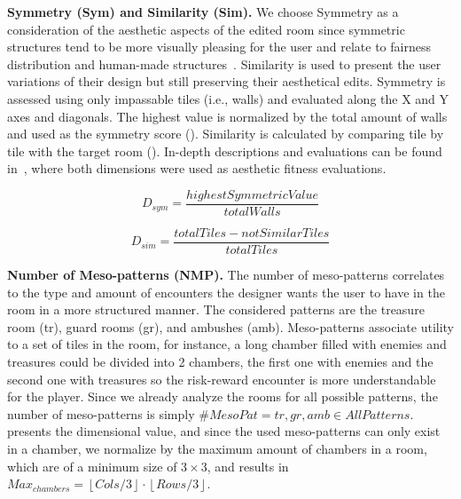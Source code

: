 \textbf{Symmetry (Sym) and Similarity (Sim).} We choose Symmetry as a consideration of the aesthetic aspects of the edited room since symmetric structures tend to be more visually pleasing for the user and relate to fairness distribution and human-made structures~\cite{p6marinho2016-symmetry,Alvarez2018a,Liapis2012-adaptiveVisual}. Similarity is used to present the user variations of their design but still preserving their aesthetical edits. Symmetry is assessed using only impassable tiles (i.e., walls) and evaluated along the X and Y axes and diagonals. The highest value is normalized by the total amount of walls and used as the symmetry score (). Similarity is calculated by comparing tile by tile with the target room (). In-depth descriptions and evaluations can be found in~\cite{p6Alvarez2018a}, where both dimensions were used as aesthetic fitness evaluations.



\begin{equation} \label{eq:Symmetry}
D_{sym} = \frac{highestSymmetricValue} {totalWalls}
\end{equation}

\begin{equation} \label{eq:similarity}
D_{sim} = \frac{totalTiles - notSimilarTiles} {totalTiles}
\end{equation}

\textbf{Number of Meso-patterns (NMP).} The number of meso-patterns correlates to the type and amount of encounters the designer wants the user to have in the room in a more structured manner. The considered patterns are the treasure room (tr), guard rooms (gr), and ambushes (amb). Meso-patterns associate utility to a set of tiles in the room, for instance, a long chamber filled with enemies and treasures could be divided into 2 chambers, the first one with enemies and the second one with treasures so the risk-reward encounter is more understandable for the player. Since we already analyze the rooms for all possible patterns, the number of meso-patterns is simply $\#MesoPat=tr, gr, amb \in AllPatterns$.  presents the dimensional value, and since the used meso-patterns can only exist in a chamber, we normalize by the maximum amount of chambers in a room, which are of a minimum size of $3\times3$, and results in $Max_{chambers}=\left\lfloor Cols/3 \right\rfloor \cdot \left\lfloor Rows/3 \right\rfloor$.

